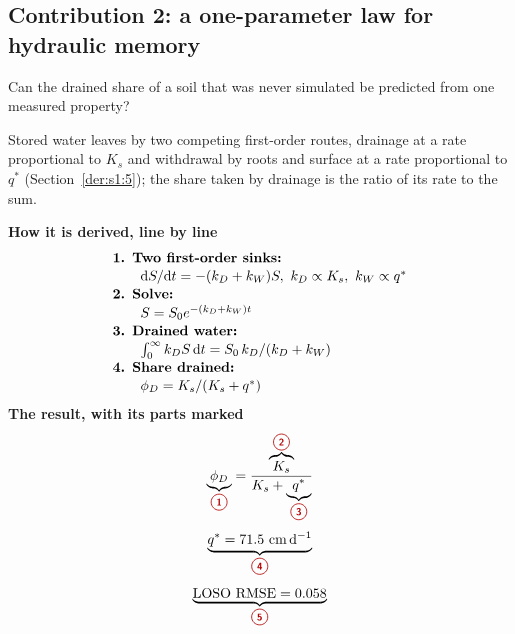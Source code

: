 \begin{pins}
\end{pins}


\subsection{Contribution 2: a one-parameter law for hydraulic memory}\label{con:s1:2}
\begin{problem}
Can the drained share of a soil that was never simulated be predicted from one measured property?
\end{problem}
\begin{derivation}
Stored water leaves by two competing first-order routes, drainage at a rate proportional to $K_s$ and withdrawal by roots and surface at a rate proportional to $q^\ast$ (Section~\ref{der:s1:5}); the share taken by drainage is the ratio of its rate to the sum.
\end{derivation}
\begin{keyresult}
\begin{pencil}
{\small\noindent\textbf{How it is derived, line by line}
\[\begin{array}{@{}l@{}}\textbf{1. Two first-order sinks:}\\[1pt]
\qquad \dd S/\dd t=-(k_D+k_W)S,\ k_D\propto K_s,\ k_W\propto q^\ast\\[1pt]
\textbf{2. Solve:}\\[1pt]
\qquad S=S_0e^{-(k_D+k_W)t}\\[1pt]
\textbf{3. Drained water:}\\[1pt]
\qquad \textstyle\int_0^\infty k_DS\,\dd t=S_0\,k_D/(k_D+k_W)\\[1pt]
\textbf{4. Share drained:}\\[1pt]
\qquad \phi_D=K_s/(K_s+q^\ast)
\end{array}\]}
\noindent\textbf{The result, with its parts marked}
\[\underbrace{\phi_D}_{\circled{1}}=\frac{\overbrace{K_s}^{\circled{2}}}{K_s+\underbrace{q^\ast}_{\circled{3}}}\]
\[\underbrace{q^\ast=71.5\ \mathrm{cm\,d^{-1}}}_{\circled{4}}\]
\[\underbrace{\text{LOSO RMSE}=0.058}_{\circled{5}}\]
\end{pencil}
\end{keyresult}
